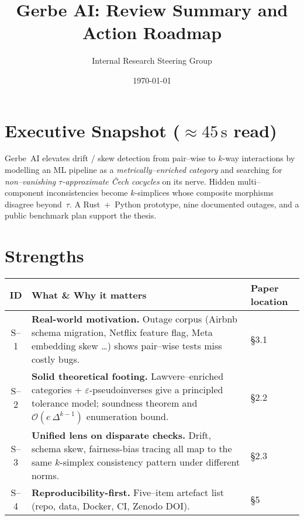 \documentclass{article}
\title{Gerbe AI: Review Summary and Action Roadmap}
\author{Internal Research Steering Group}
\date{\today}
\begin{document}
\maketitle

\section*{Executive Snapshot (\(\approx 45\,\text{s}\) read)}
Gerbe~AI elevates drift / skew detection from pair--wise to \(k\)-way interactions by modelling an ML pipeline as a \emph{metrically--enriched category} and searching for \emph{non--vanishing \(\tau\)-approximate \v{C}ech cocycles} on its nerve. Hidden multi--component inconsistencies become \(k\)-simplices whose composite morphisms disagree beyond~\(\tau\). A Rust~+~Python prototype, nine documented outages, and a public benchmark plan support the thesis.

\bigskip

\section{Strengths}
\begin{tabular}{@{}c L{6.4cm} L{2.5cm}@{}}
\toprule
\textbf{ID} & \textbf{What \& Why it matters} & \textbf{Paper location} \\
\midrule
S--1 & \textbf{Real\hyp world motivation.} Outage corpus (Airbnb schema migration, Netflix feature flag, Meta embedding skew \ldots) shows pair--wise tests miss costly bugs. & \S3.1 \\
S--2 & \textbf{Solid theoretical footing.} Lawvere--enriched categories + \(\varepsilon\)-pseudoinverses give a principled tolerance model; soundness theorem and \(\mathcal O(e\,\Delta^{k-1})\) enumeration bound. & \S2.2 \\
S--3 & \textbf{Unified lens on disparate checks.} Drift, schema skew, fairness\hyp bias tracing all map to the same \(k\)-simplex consistency pattern under different norms. & \S2.3 \\
S--4 & \textbf{Reproducibility\hyp first.} Five--item artefact list (repo, data, Docker, CI, Zenodo DOI). & \S5 \\
\bottomrule
\end{tabular}
\end{document}
